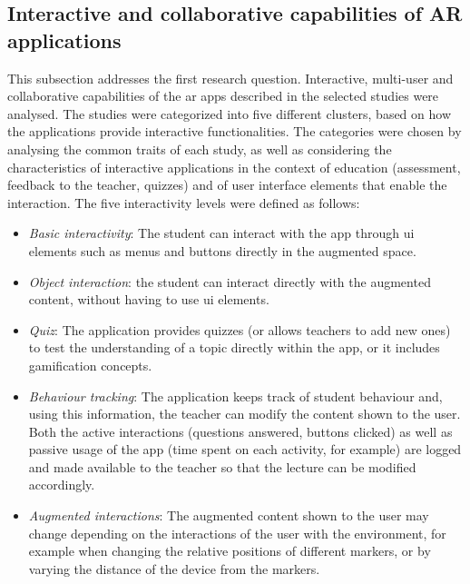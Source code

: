 \begin{figure}[htbp]	
	\begin{center}
	
	\captionsetup{font=small}
	\caption{\fontsize{10pt}{11pt}}
	\label{fig:software}
    \end{center}
\end{figure}

\subsection{Interactive and collaborative capabilities of AR applications}\label{sota:results:RQ1}

This subsection addresses the first research question. Interactive, multi-user and collaborative capabilities of the \gls{ar} apps described in the selected studies were analysed. The studies were categorized into five different clusters, based on how the applications provide interactive functionalities. The categories were chosen by analysing the common traits of each study, as well as considering the characteristics of interactive applications in the context of education (assessment, feedback to the teacher, quizzes) and of user interface elements that enable the interaction. The five interactivity levels were defined as follows:

\begin{itemize}
    \item \emph{Basic interactivity}: The student can interact with the app through \gls{ui} elements such as menus and buttons directly in the augmented space.
    \item \emph{Object interaction}: the student can interact directly with the augmented content, without having to use \gls{ui} elements.
    \item \emph{Quiz}: The application provides quizzes (or allows teachers to add new ones) to test the understanding of a topic directly within the app, or it includes gamification concepts.
    \item \emph{Behaviour tracking}: The application keeps track of student behaviour and, using this information, the teacher can modify the content shown to the user. Both the active interactions (questions answered, buttons clicked) as well as passive usage of the app (time spent on each activity, for example) are logged and made available to the teacher so that the lecture can be modified accordingly.
    \item \emph{Augmented interactions}: The augmented content shown to the user may change depending on the interactions of the user with the environment, for example when changing the relative positions of different markers, or by varying the distance of the device from the markers.
\end{itemize}

